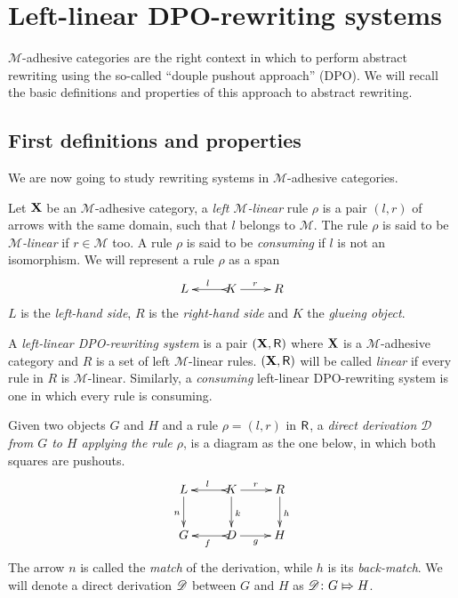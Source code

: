 \chapter{Left-linear DPO-rewriting systems}

$\mathcal{M}$-adhesive categories are the right context in which to perform abstract rewriting using the so-called ``douple pushout approach'' (DPO). We will recall the basic definitions and properties of this approach to abstract rewriting. 
\section{First definitions and properties}
We are now going to study rewriting systems in $\mathcal{M}$-adhesive categories.

\begin{definition}
	Let $\textbf {\textup{X}}$ be an $\mathcal{M}$-adhesive category, a  \emph{left $\mathcal{M}$-linear} rule $\rho$ is a pair $(l,r)$ of arrows with the same domain, such that $l$ belongs to $\mathcal{M}$.  The rule $\rho$ is said to be \emph{$\mathcal{M}$-linear} if $r\in \mathcal{M}$ too. A rule $\rho$ is said to be \emph{consuming} if $l$ is not an isomorphism. We will represent a rule $\rho$ as a span 
	\[\xymatrix{L & K\ar@{>->}[l]_{l} \ar[r]^{r} & R}\]
	$L$ is the \emph{left-hand side}, $R$ is the \emph{right-hand side} and $K$ the \emph{glueing object}. 
	
	
	A \emph{left-linear DPO-rewriting system} is a pair $(\textbf {\textup{X}}, \mathsf{R})$ where $\textbf {\textup{X}}$ is a $\mathcal{M}$-adhesive category and $R$ is a set of left $\mathcal{M}$-linear rules. $(\textbf {\textup{X}}, \mathsf{R})$ will be called \emph{linear} if every rule in $R$ is $\mathcal{M}$-linear. Similarly, a \emph{consuming} left-linear DPO-rewriting system is one in which every rule is consuming.
	
	Given  two objects $G$ and $H$ and a rule $\rho=(l,r)$ in $\mathsf{R}$, a \emph{direct derivation $\mathscr{D}$ from $G$ to $H$ applying the rule $\rho$}, is a diagram as the one below, in which both squares are pushouts. 
	\[\xymatrix{L \ar[d]_{n}& K \ar[d]^{k}\ar@{>->}[l]_{l} \ar[r]^{r} & R \ar[d]^{h}\\G & \ar@{>->}[l]^{f} D \ar[r]_{g}& H}\]
	The arrow $n$ is called the \emph{match} of the derivation, while $h$ is its \emph{back-match}.
	We will denote a direct derivation $\mathscr{D}$ between $G$ and $H$ as $\mathscr{D}\colon G\Mapsto H$. 
\end{definition}


